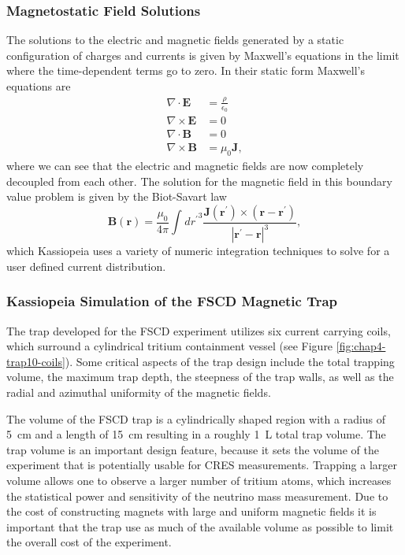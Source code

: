 \subsubsection*{Magnetostatic Field Solutions}

The solutions to the electric and magnetic fields generated by a static configuration of charges and currents is given by Maxwell's equations in the limit where the time-dependent terms go to zero. In their static form Maxwell's equations are
\begin{align}
    \nabla\cdot\mathbf{E}&=\frac{\rho}{\epsilon_0}\\
    \nabla\times\mathbf{E}&=0\\
    \nabla\cdot\mathbf{B}&=0\\
    \nabla\times\mathbf{B}&=\mu_0\mathbf{J},
\end{align}
where we can see that the electric and magnetic fields are now completely decoupled from each other. The solution for the magnetic field in this boundary value problem is given by the Biot-Savart law
\begin{equation}
    \mathbf{B}(\mathbf{r}) = \frac{\mu_0}{4\pi}\int_{}^{}{d{r^{'}}^{3}\frac{\mathbf{J}(\mathbf{r}^{'})\times (\mathbf{r}-\mathbf{r}^{'})}{|\mathbf{r}^{'}-\mathbf{r}|^{3}}},
\end{equation}
which Kassiopeia uses a variety of numeric integration techniques to solve for a user defined current distribution.

\subsubsection*{Kassiopeia Simulation of the FSCD Magnetic Trap}

The trap developed for the FSCD experiment utilizes six current carrying coils, which surround a cylindrical tritium containment vessel (see Figure \ref{fig:chap4-trap10-coils}). Some critical aspects of the trap design include the total trapping volume, the maximum trap depth, the steepness of the trap walls, as well as the radial and azimuthal uniformity of the magnetic fields.

The volume of the FSCD trap is a cylindrically shaped region with a radius of 5~cm and a length of 15~cm resulting in a roughly 1~L total trap volume. The trap volume is an important design feature, because it sets the volume of the experiment that is potentially usable for CRES measurements. Trapping a larger volume allows one to observe a larger number of tritium atoms, which increases the statistical power and sensitivity of the neutrino mass measurement. Due to the cost of constructing magnets with large and uniform magnetic fields it is important that the trap use as much of the available volume as possible to limit the overall cost of the experiment.

